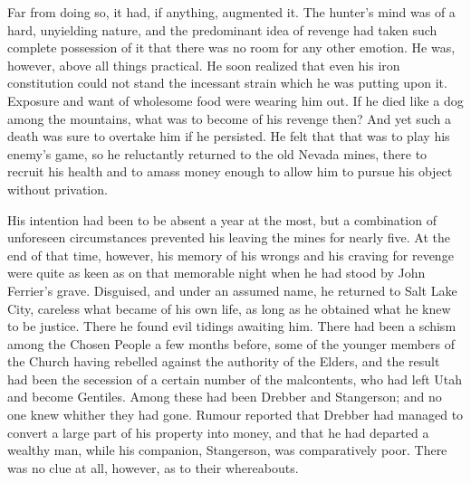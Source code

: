 \documentclass[12pt,english]{book}
\begin{document}
Far from doing so, it had, if anything, augmented it. The hunter's
mind was of a hard, unyielding nature, and the predominant idea of
revenge had taken such complete possession of it that there was no
room for any other emotion. He was, however, above all things practical.
He soon realized that even his iron constitution could not stand the
incessant strain which he was putting upon it. Exposure and want of
wholesome food were wearing him out. If he died like a dog among the
mountains, what was to become of his revenge then? And yet such a
death was sure to overtake him if he persisted. He felt that that
was to play his enemy's game, so he reluctantly returned to the old
Nevada mines, there to recruit his health and to amass money enough
to allow him to pursue his object without privation.

His intention had been to be absent a year at the most, but a combination
of unforeseen circumstances prevented his leaving the mines for nearly
five. At the end of that time, however, his memory of his wrongs and
his craving for revenge were quite as keen as on that memorable night
when he had stood by John Ferrier's grave. Disguised, and under an
assumed name, he returned to Salt Lake City, careless what became
of his own life, as long as he obtained what he knew to be justice.
There he found evil tidings awaiting him. There had been a schism
among the Chosen People a few months before, some of the younger members
of the Church having rebelled against the authority of the Elders,
and the result had been the secession of a certain number of the malcontents,
who had left Utah and become Gentiles. Among these had been Drebber
and Stangerson; and no one knew whither they had gone. Rumour reported
that Drebber had managed to convert a large part of his property into
money, and that he had departed a wealthy man, while his companion,
Stangerson, was comparatively poor. There was no clue at all, however,
as to their whereabouts.
\end{document}
